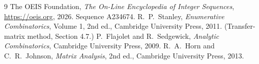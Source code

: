 \documentclass[11pt,a4paper]{article}
\theoremstyle{plain}
\theoremstyle{definition}
\begin{document}
\begin{thebibliography}{9}
 The OEIS Foundation, \emph{The On-Line Encyclopedia of Integer
Sequences}, \url{https://oeis.org}, 2026. Sequence A234674.
 R.~P.~Stanley, \emph{Enumerative Combinatorics}, Volume 1, 2nd ed.,
Cambridge University Press, 2011. (Transfer-matrix method, Section 4.7.)
 P.~Flajolet and R.~Sedgewick, \emph{Analytic Combinatorics}, Cambridge
University Press, 2009.
 R.~A.~Horn and C.~R.~Johnson, \emph{Matrix Analysis}, 2nd ed., Cambridge
University Press, 2013.
\end{thebibliography}
\end{document}
